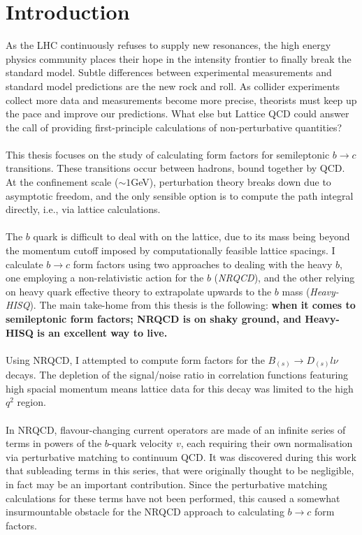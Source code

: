 \chapter{Introduction}
\label{sec:intro}

As the LHC continuously refuses to supply new resonances, the high energy physics community places their hope in the intensity frontier to finally break the standard model. Subtle differences between experimental measurements and standard model predictions are the new rock and roll. As collider experiments collect more data and measurements become more precise, theorists must keep up the pace and improve our predictions. What else but Lattice QCD could answer the call of providing first-principle calculations of non-perturbative quantities?
\\ \\
This thesis focuses on the study of calculating form factors for semileptonic $b\to c$ transitions. These transitions occur between hadrons, bound together by QCD. At the confinement scale ($\sim 1$GeV), perturbation theory breaks down due to asymptotic freedom, and the only sensible option is to compute the path integral directly, i.e., via lattice calculations.
\\ \\
The $b$ quark is difficult to deal with on the lattice, due to its mass being beyond the momentum cutoff imposed by computationally feasible lattice spacings. I calculate $b\to c$ form factors using two approaches to dealing with the heavy $b$, one employing a non-relativistic action for the $b$ ({\textit{NRQCD}}), and the other relying on heavy quark effective theory to extrapolate upwards to the $b$ mass ({\textit{Heavy-HISQ}}). The main take-home from this thesis is the following: {\textbf{when it comes to semileptonic form factors; NRQCD is on shaky ground, and Heavy-HISQ is an excellent way to live.}}
\\ \\
Using NRQCD, I attempted to compute form factors for the $B_{(s)}\to D_{(s)}l\nu$ decays. The depletion of the signal/noise ratio in correlation functions featuring high spacial momentum means lattice data for this decay was limited to the high $q^2$ region.
\\ \\
In NRQCD, flavour-changing current operators are made of an infinite series of terms in powers of the $b$-quark velocity $v$, each requiring their own normalisation via perturbative matching to continuum QCD. It was discovered during this work that subleading terms in this series, that were originally thought to be negligible, in fact may be an important contribution. Since the perturbative matching calculations for these terms have not been performed, this caused a somewhat insurmountable obstacle for the NRQCD approach to calculating $b\to c$ form factors.
